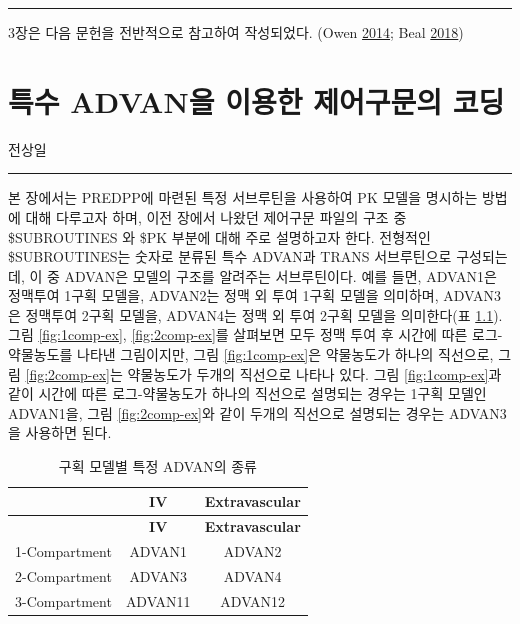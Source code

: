 \documentclass[
  11pt,
  krantz2,
  a4paper]{krantz}
\theoremstyle{definition}
\theoremstyle{definition}
\theoremstyle{definition}
\theoremstyle{remark}
\begin{document}
\begin{center}\rule{0.5\linewidth}{0.5pt}\end{center}

3장은 다음 문헌을 전반적으로 참고하여 작성되었다. (Owen \protect\hyperlink{ref-kelly}{2014}; Beal \protect\hyperlink{ref-nonmem}{2018})

\hypertarget{specific-advan}{%
\chapter{특수 ADVAN을 이용한 제어구문의 코딩}\label{specific-advan}}


\Large\hfill

전상일
\normalsize

\begin{center}\rule{0.5\linewidth}{0.5pt}\end{center}

본 장에서는 PREDPP에 마련된 특정 서브루틴을 사용하여 PK 모델을 명시하는 방법에 대해 다루고자 하며, 이전 장에서 나왔던 제어구문 파일의 구조 중 \$SUBROUTINES 와 \$PK 부분에 대해 주로 설명하고자 한다. 전형적인 \$SUBROUTINES는 숫자로 분류된 특수 ADVAN과 TRANS 서브루틴으로 구성되는데, 이 중 ADVAN은 모델의 구조를 알려주는 서브루틴이다. 예를 들면, ADVAN1은 정맥투여 1구획 모델을, ADVAN2는 정맥 외 투여 1구획 모델을 의미하며, ADVAN3은 정맥투여 2구획 모델을, ADVAN4는 정맥 외 투여 2구획 모델을 의미한다(표 \ref{tab:specific-advan}). 그림 \ref{fig:1comp-ex}, \ref{fig:2comp-ex}를 살펴보면 모두 정맥 투여 후 시간에 따른 로그-약물농도를 나타낸 그림이지만, 그림 \ref{fig:1comp-ex}은 약물농도가 하나의 직선으로, 그림 \ref{fig:2comp-ex}는 약물농도가 두개의 직선으로 나타나 있다. 그림 \ref{fig:1comp-ex}과 같이 시간에 따른 로그-약물농도가 하나의 직선으로 설명되는 경우는 1구획 모델인 ADVAN1을, 그림 \ref{fig:2comp-ex}와 같이 두개의 직선으로 설명되는 경우는 ADVAN3을 사용하면 된다.

\begin{longtable}[]{@{}ccc@{}}
\caption{\label{tab:specific-advan} 구획 모델별 특정 ADVAN의 종류}\tabularnewline
\toprule
& \textbf{IV} & \textbf{Extravascular}\tabularnewline
\midrule
\endfirsthead
\toprule
& \textbf{IV} & \textbf{Extravascular}\tabularnewline
\midrule
\endhead
1-Compartment & ADVAN1 & ADVAN2\tabularnewline
2-Compartment & ADVAN3 & ADVAN4\tabularnewline
3-Compartment & ADVAN11 & ADVAN12\tabularnewline
\bottomrule
\end{longtable}
\end{document}
